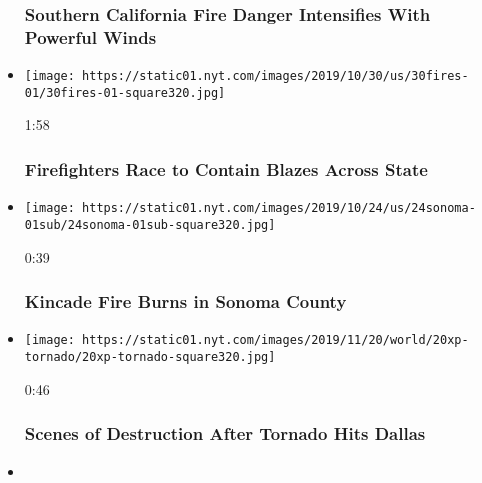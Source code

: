 \begin{itemize}
{  \subsubsection{Southern California Fire Danger Intensifies With
  Powerful
  Winds}\label{southern-california-fire-danger-intensifies-with-powerful-winds}}
\item
  \href{https://www.nytimes.com/video/us/100000006792866/wildfires-california.html?action=click\&module=video-series-bar\&region=header\&pgtype=Article\&playlistId=video/extreme-weather}{}

  \texttt{[image: https://static01.nyt.com/images/2019/10/30/us/30fires-01/30fires-01-square320.jpg]}

  1:58

  \hypertarget{firefighters-race-to-contain-blazes-across-state}{%
  \subsubsection{Firefighters Race to Contain Blazes Across
  State}\label{firefighters-race-to-contain-blazes-across-state}}
\item
  \href{https://www.nytimes.com/video/us/100000006786878/kincade-fire-california.html?action=click\&module=video-series-bar\&region=header\&pgtype=Article\&playlistId=video/extreme-weather}{}

  \texttt{[image: https://static01.nyt.com/images/2019/10/24/us/24sonoma-01sub/24sonoma-01sub-square320.jpg]}

  0:39

  \hypertarget{kincade-fire-burns-in-sonoma-county}{%
  \subsubsection{Kincade Fire Burns in Sonoma
  County}\label{kincade-fire-burns-in-sonoma-county}}
\item
  \href{https://www.nytimes.com/video/us/100000006779675/tornado-dallas.html?action=click\&module=video-series-bar\&region=header\&pgtype=Article\&playlistId=video/extreme-weather}{}

  \texttt{[image: https://static01.nyt.com/images/2019/11/20/world/20xp-tornado/20xp-tornado-square320.jpg]}

  0:46

  \hypertarget{scenes-of-destruction-after-tornado-hits-dallas}{%
  \subsubsection{Scenes of Destruction After Tornado Hits
  Dallas}\label{scenes-of-destruction-after-tornado-hits-dallas}}
\item
  \href{https://www.nytimes.com/video/climate/100000006743923/montana-snow-storm.html?action=click\&module=video-series-bar\&region=header\&pgtype=Article\&playlistId=video/extreme-weather}{}


\end{itemize}
